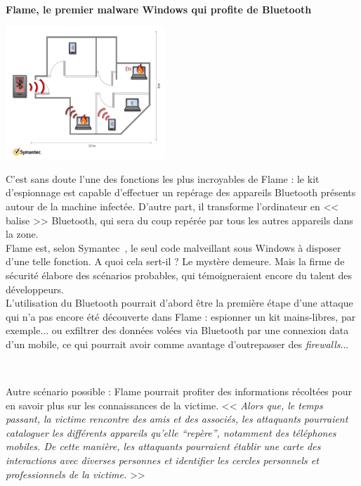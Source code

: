 \documentclass[11pt,twoside,a4paper]{article}
\begin{document}
~

\dotfill

\textbf{\large Flame, le premier malware Windows qui profite de Bluetooth}~\\

\begin{minipage}[ht]{6.25cm}
	\includegraphics[width=6.00cm]{img/685339.png}
\end{minipage} \hfill \begin{minipage}[ht]{12.50cm}
	\small 
	C'est sans doute l'une des fonctions les plus incroyables de Flame : le kit d'espionnage est capable d'effectuer un rep{\'e}rage des appareils Bluetooth pr{\'e}sents autour de la machine infect{\'e}e. D'autre part, il transforme l'ordinateur en << balise >> Bluetooth, qui sera du coup rep{\'e}r{\'e}e par tous les autres appareils dans la zone.~\\
	
	Flame est, selon Symantec~\footnotemark, le seul code malveillant sous Windows {\`a} disposer d'une telle fonction. A quoi cela sert-il ? Le myst{\`e}re demeure. Mais la firme de s{\'e}curit{\'e} {\'e}labore des sc{\'e}narios probables, qui t{\'e}moigneraient encore du talent des d{\'e}veloppeurs.~\\
	
	L'utilisation du Bluetooth pourrait d'abord {\^e}tre la premi{\`e}re {\'e}tape d'une attaque qui n'a pas encore {\'e}t{\'e} d{\'e}couverte dans Flame : espionner un kit mains-libres, par exemple... ou exfiltrer des donn{\'e}es vol{\'e}es via Bluetooth par une connexion data d'un mobile, ce qui pourrait avoir comme avantage d'outrepasser des \emph{firewalls}...~\\
\end{minipage}
~

Autre sc{\'e}nario possible : Flame pourrait profiter des informations r{\'e}colt{\'e}es pour en savoir plus sur les connaissances de la victime. << \emph{Alors que, le temps passant, la victime rencontre des amis et des associ{\'e}s, les attaquants pourraient cataloguer les diff{\'e}rents appareils qu'elle ``rep{\`e}re'', notamment des t{\'e}l{\'e}phones mobiles. De cette mani{\`e}re, les attaquants pourraient {\'e}tablir une carte des interactions avec diverses personnes et identifier les cercles personnels et professionnels de la victime. } >>~\\
\end{document}
